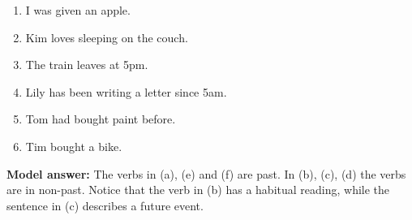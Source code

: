 \documentclass[a4,11pt]{article}
\newcommand{\6}{\mbox{$[\hspace*{-.6mm}[$}}
\newcommand{\9}{\mbox{$]\hspace*{-.6mm}]$}}
\begin{document}
\begin{enumerate}[leftmargin = 12pt]
\begin{enumerate}[noitemsep]

\item I was given an apple.  

\item Kim loves sleeping on the couch.

\item  The train leaves at 5pm.

\item Lily has been writing a letter since 5am.

\item Tom had bought paint before.

\item Tim bought a bike.

\end{enumerate}

{\bf Model answer:} The verbs in (a), (e) and (f) are past. In (b), (c), (d) the verbs are in non-past. Notice that the verb in (b) has a habitual reading, while the sentence in (c) describes a future event.
\end{enumerate}
\end{document}
